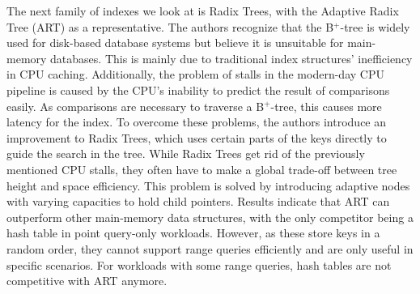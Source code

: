 The next family of indexes we look at is Radix Trees, with the Adaptive Radix Tree (ART) \cite{Leis2013} as a representative. The authors recognize that the B$^+$-tree is widely used for disk-based database systems but believe it is unsuitable for main-memory databases. This is mainly due to traditional index structures' inefficiency in CPU caching. Additionally, the problem of stalls in the modern-day CPU pipeline is caused by the CPU's inability to predict the result of comparisons easily. As comparisons are necessary to  traverse a B$^+$-tree, this causes more latency for the index. To overcome these problems, the authors introduce an improvement to Radix Trees, which uses certain parts of the keys directly to guide the search in the tree. While Radix Trees get rid of the previously mentioned CPU stalls, they often have to make a global trade-off between tree height and space efficiency. This problem is solved by introducing adaptive nodes with varying capacities to hold child pointers. Results indicate that ART can outperform other main-memory data structures, with the only competitor being a hash table in point query-only workloads. However, as these store keys in a random order, they cannot support range queries efficiently and are only useful in specific scenarios. For workloads with some range queries, hash tables are not competitive with ART anymore.

